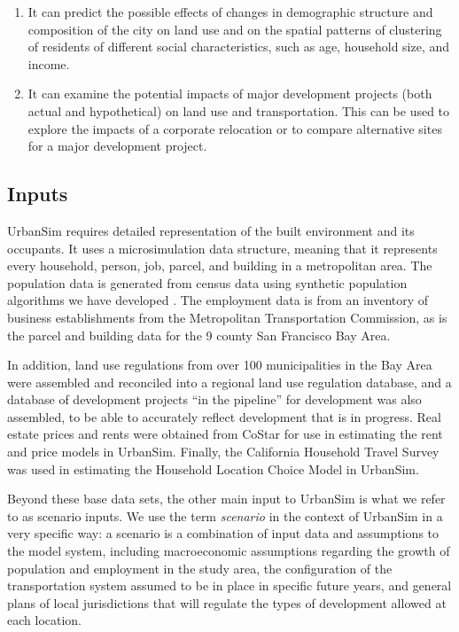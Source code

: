 \begin{enumerate}
\item It can predict the possible effects of changes in demographic structure and composition of the city on land use and on the spatial patterns of clustering of residents of different social characteristics, such as age, household size, and income.

\item It can examine the potential impacts of major development projects (both actual and hypothetical) on land use and transportation. This can be used to explore the impacts of a corporate relocation or to compare alternative sites for a major development project.
\end{enumerate}


\subsection{Inputs}

UrbanSim requires detailed representation of the built environment and its occupants.  It uses a microsimulation data structure, meaning that it represents every household, person, job, parcel, and building in a metropolitan area. The population data is generated from census data using synthetic population algorithms we have developed \citep{ye-trb-2009}.  The employment data is from an inventory of business establishments from the Metropolitan Transportation Commission, as is the parcel and building data for the 9 county San Francisco Bay Area.

In addition, land use regulations from over 100 municipalities in the Bay Area were assembled and reconciled into a regional land use regulation database, and a database of development projects \enquote{in the pipeline} for development was also assembled, to be able to accurately reflect development that is in progress.  Real estate prices and rents were obtained from CoStar for use in estimating the rent and price models in UrbanSim.  Finally, the California Household Travel Survey was used in estimating the Household Location Choice Model in UrbanSim.

Beyond these base data sets, the other main input to UrbanSim is what we refer to as scenario inputs. We use the term \emph{scenario} in the context of UrbanSim in a very specific way: a scenario is a combination of input data and assumptions to the model system, including macroeconomic assumptions regarding the growth of population and employment in the study area, the configuration of the transportation system assumed to be in place in specific future years, and general plans of local jurisdictions that will regulate the types of development allowed at each location.

